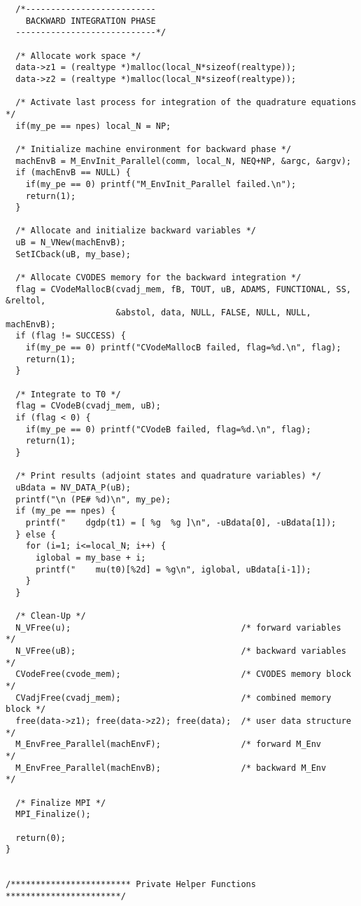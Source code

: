\begin{verbatim}
  /*-------------------------- 
    BACKWARD INTEGRATION PHASE 
  ----------------------------*/

  /* Allocate work space */
  data->z1 = (realtype *)malloc(local_N*sizeof(realtype));
  data->z2 = (realtype *)malloc(local_N*sizeof(realtype));

  /* Activate last process for integration of the quadrature equations */
  if(my_pe == npes) local_N = NP;

  /* Initialize machine environment for backward phase */
  machEnvB = M_EnvInit_Parallel(comm, local_N, NEQ+NP, &argc, &argv);
  if (machEnvB == NULL) {
    if(my_pe == 0) printf("M_EnvInit_Parallel failed.\n"); 
    return(1);
  }

  /* Allocate and initialize backward variables */
  uB = N_VNew(machEnvB);
  SetICback(uB, my_base);

  /* Allocate CVODES memory for the backward integration */
  flag = CVodeMallocB(cvadj_mem, fB, TOUT, uB, ADAMS, FUNCTIONAL, SS, &reltol, 
                      &abstol, data, NULL, FALSE, NULL, NULL, machEnvB);
  if (flag != SUCCESS) { 
    if(my_pe == 0) printf("CVodeMallocB failed, flag=%d.\n", flag);
    return(1);
  }

  /* Integrate to T0 */
  flag = CVodeB(cvadj_mem, uB);
  if (flag < 0) { 
    if(my_pe == 0) printf("CVodeB failed, flag=%d.\n", flag);
    return(1);
  }

  /* Print results (adjoint states and quadrature variables) */
  uBdata = NV_DATA_P(uB);
  printf("\n (PE# %d)\n", my_pe);
  if (my_pe == npes) {
    printf("    dgdp(t1) = [ %g  %g ]\n", -uBdata[0], -uBdata[1]);
  } else {
    for (i=1; i<=local_N; i++) {
      iglobal = my_base + i;
      printf("    mu(t0)[%2d] = %g\n", iglobal, uBdata[i-1]);
    }
  }

  /* Clean-Up */
  N_VFree(u);                                  /* forward variables     */
  N_VFree(uB);                                 /* backward variables    */
  CVodeFree(cvode_mem);                        /* CVODES memory block   */    
  CVadjFree(cvadj_mem);                        /* combined memory block */
  free(data->z1); free(data->z2); free(data);  /* user data structure   */
  M_EnvFree_Parallel(machEnvF);                /* forward M_Env         */
  M_EnvFree_Parallel(machEnvB);                /* backward M_Env        */
  
  /* Finalize MPI */
  MPI_Finalize();

  return(0);
}


/************************ Private Helper Functions ***********************/


\end{verbatim}
